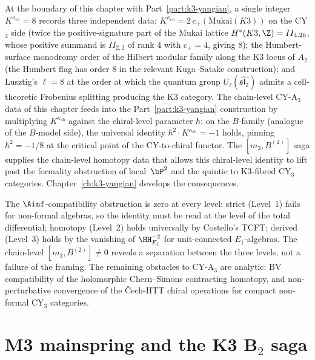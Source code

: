 \begin{remark}
\label{rem:m3b2-DNA-three-faces-eight}
At the boundary of this chapter with Part~\ref{part:k3-yangian},
a single integer $K^{\kappa_{\mathrm{ch}}} = 8$ records three
independent data: $K^{\kappa_{\mathrm{ch}}}
= 2\,c_+(\mathrm{Mukai}(K3))$ on the CY$_2$ side (twice the
positive-signature part of the Mukai lattice $H^\ast(K3, \Z) =
II_{4,20}$, whose positive summand is $II_{2,2}$ of rank $4$
with $c_+ = 4$, giving $8$); the Humbert-surface monodromy
order of the Hilbert modular family along the K3 locus of $A_2$
(the Humbert flag has order $8$ in the relevant Kuga--Satake
construction); and Lusztig's $\ell = 8$ at the order at which
the quantum group $U_\ell(\widehat{\mathfrak{sl}_2})$ admits a
cell-theoretic Frobenius splitting producing the K3 category.
The chain-level CY-A$_3$ data of this chapter feeds into the
Part~\ref{part:k3-yangian} construction by multiplying
$K^{\kappa_{\mathrm{ch}}}$ against the chiral-level parameter
$\hbar$: on the $B$-family (analogue of the $B$-model side),
the universal identity $\hbar^2 \cdot K^{\kappa_{\mathrm{ch}}} = -1$
holds, pinning $\hbar^2 = -1/8$ at the critical point of the
CY-to-chiral functor.  The $[m_3, B^{(2)}]$ saga supplies the
chain-level homotopy data that allows this chiral-level
identity to lift past the formality obstruction of local~$\bP^2$
and the quintic to K3-fibred CY$_3$ categories.  Chapter~\ref{ch:k3-yangian}
develops the consequences.
\end{remark}

\bigskip

The $\Ainf$-compatibility obstruction is zero at every level:
strict (Level~1) fails for non-formal algebras, so the identity
must be read at the level of the total differential; homotopy
(Level~2) holds universally by Costello's TCFT;  derived
(Level~3) holds by the vanishing of $\HH^{-2}_{E_1}$ for
unit-connected $E_1$-algebras.  The chain-level
$[m_3, B^{(2)}] \neq 0$ reveals a separation between the three
levels, not a failure of the framing.  The remaining obstacles
to CY-A$_3$ are analytic: BV compatibility of the holomorphic
Chern--Simons contracting homotopy, and non-perturbative
convergence of the \v{C}ech-HTT chiral operations for compact
non-formal CY$_3$ categories.

\section{M3 mainspring and the K3 B$_2$ saga}
\label{sec:m3b2-k3-base}

